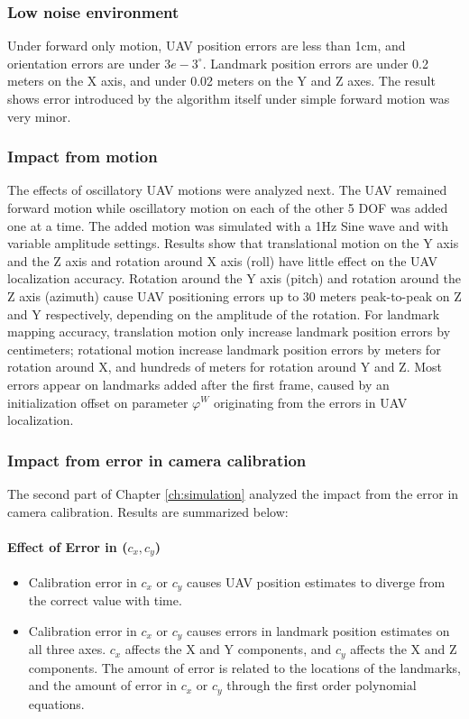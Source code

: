 \subsubsection{Low noise environment}
Under forward only motion, UAV position errors are less than 1cm, and
orientation errors are under $3e-3^\circ$. Landmark position errors
are under 0.2 meters on the X axis, and under 0.02 meters on the Y and
Z axes. The result shows error introduced by the algorithm
itself under simple forward motion was very minor.

\subsubsection{Impact from motion}
The effects of oscillatory UAV motions were analyzed next. The UAV
remained forward motion while oscillatory motion on each of the other
5 DOF was added one at a time. The added motion was simulated with a
1Hz Sine wave and with variable amplitude settings. Results show that
translational motion on the Y axis and the Z axis and rotation around X axis
(roll) have little effect on the UAV localization accuracy. Rotation
around the Y axis (pitch) and rotation around the Z axis (azimuth) cause UAV
positioning errors up to 30 meters peak-to-peak on Z and Y
respectively, depending on the amplitude of the rotation. For landmark
mapping accuracy, translation motion only increase landmark
position errors by centimeters; rotational motion increase landmark
position errors by meters for rotation around X, and hundreds of
meters for rotation around Y and Z. Most errors appear on landmarks
added after the first frame, caused by an initialization offset on
parameter $\varphi^W$ originating from the errors in UAV localization.

\subsubsection{Impact from error in camera calibration} 
The second part of Chapter \ref{ch:simulation} analyzed the impact from the
error in camera calibration. Results are summarized below:

\paragraph{Effect of Error in ($c_x, c_y$)}
\begin{itemize}
  \item Calibration error in $c_x$ or $c_y$ causes UAV position estimates to diverge from the correct value with time.
  \item Calibration error in $c_x$ or $c_y$ causes errors in landmark
  position estimates on all three axes. $c_x$ affects the X and Y
  components, and $c_y$ affects the X and Z components. The amount of
  error is related to the locations of the landmarks, and the amount
  of error in $c_x$ or $c_y$ through the first order polynomial equations.
\end{itemize}

